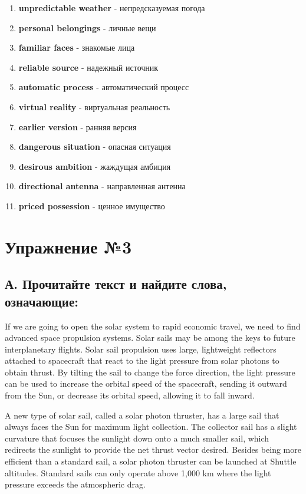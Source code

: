 \begin{enumerate}
      \item \textbf{unpredictable weather} - непредсказуемая погода
      \item \textbf{personal belongings} - личные вещи
      \item \textbf{familiar faces} - знакомые лица
      \item \textbf{reliable source} - надежный источник
      \item \textbf{automatic process} - автоматический процесс
      \item \textbf{virtual reality} - виртуальная реальность
      \item \textbf{earlier version} - ранняя версия
      \item \textbf{dangerous situation} - опасная ситуация
      \item \textbf{desirous ambition} - жаждущая амбиция
      \item \textbf{directional antenna} - направленная антенна
      \item \textbf{priced possession} - ценное имущество
\end{enumerate}

\section{Упражнение №3}
\subsection*{А. Прочитайте текст и найдите слова, означающие:}


If we are going to open the solar system to rapid economic travel, we need to find advanced space propulsion systems. Solar sails may be among the keys to future interplanetary flights. Solar sail propulsion uses large, lightweight reflectors attached to spacecraft that react to the light pressure from solar photons to obtain thrust. By tilting the sail to change the force direction, the light pressure can be used to increase the orbital speed of the spacecraft, sending it outward from the Sun, or decrease its orbital speed, allowing it to fall inward.

A new type of solar sail, called a solar photon thruster, has a large sail that always faces the Sun for maximum light collection. The collector sail has a slight curvature that focuses the sunlight down onto a much smaller sail, which redirects the sunlight to provide the net thrust vector desired. Besides being more efficient than a standard sail, a solar photon thruster can be launched at Shuttle altitudes. Standard sails can only operate above 1,000 km where the light pressure exceeds the atmospheric drag.

